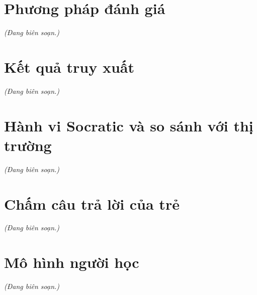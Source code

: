 \section{Phương pháp đánh giá}\label{sec:eval-method}
\emph{(Đang biên soạn.)}

\section{Kết quả truy xuất}\label{sec:eval-rag}
\emph{(Đang biên soạn.)}

\section{Hành vi Socratic và so sánh với thị trường}\label{sec:eval-socratic}
\emph{(Đang biên soạn.)}

\section{Chấm câu trả lời của trẻ}\label{sec:eval-grading}
\emph{(Đang biên soạn.)}

\section{Mô hình người học}\label{sec:eval-learner}
\emph{(Đang biên soạn.)}
